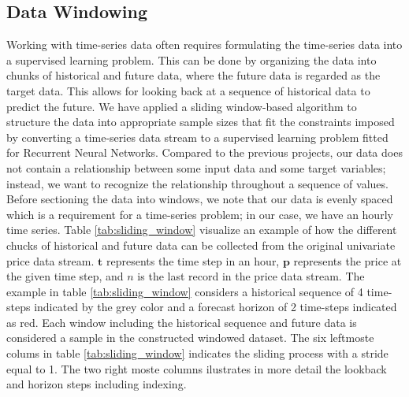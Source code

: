 \documentclass
[twocolumn,
secnumarabic,
nobibnotes,
aps,
prl,
reprint,
groupedaddress,
amsmath,
amssymb,
]{revtex4-2}
\begin{document}
\subsection{Data Windowing}
Working with time-series data often requires formulating the time-series data into a supervised learning problem. This can be done by organizing the data into chunks of historical and future data, where the future data is regarded as the target data. This allows for looking back at a sequence of historical data to predict the future. We have applied a sliding window-based algorithm to structure the data into appropriate sample sizes that fit the constraints imposed by converting a time-series data stream to a supervised learning problem fitted for Recurrent Neural Networks. Compared to the previous projects, our data does not contain a relationship between some input data and some target variables; instead, we want to recognize the relationship throughout a sequence of values. Before sectioning the data into windows, we note that our data is evenly spaced which is a requirement for a time-series problem; in our case, we have an hourly time series. Table \ref{tab:sliding_window} visualize an example of how the different chucks of historical and future data can be collected from the original univariate price data stream. $\mathbf{t}$ represents the time step in an hour, $\mathbf{p}$ represents the price at the given time step, and ${n}$ is the last record in the price data stream. The example in table \ref{tab:sliding_window} considers a historical sequence of 4 time-steps indicated by the grey color and a forecast horizon of 2 time-steps indicated as red. Each window including the historical sequence and future data is considered a sample in the constructed windowed dataset. The six leftmoste colums in table \ref{tab:sliding_window} indicates the sliding process with a stride equal to 1. The two right moste columns ilustrates in more detail the lookback and horizon steps including indexing. 
\end{document}
